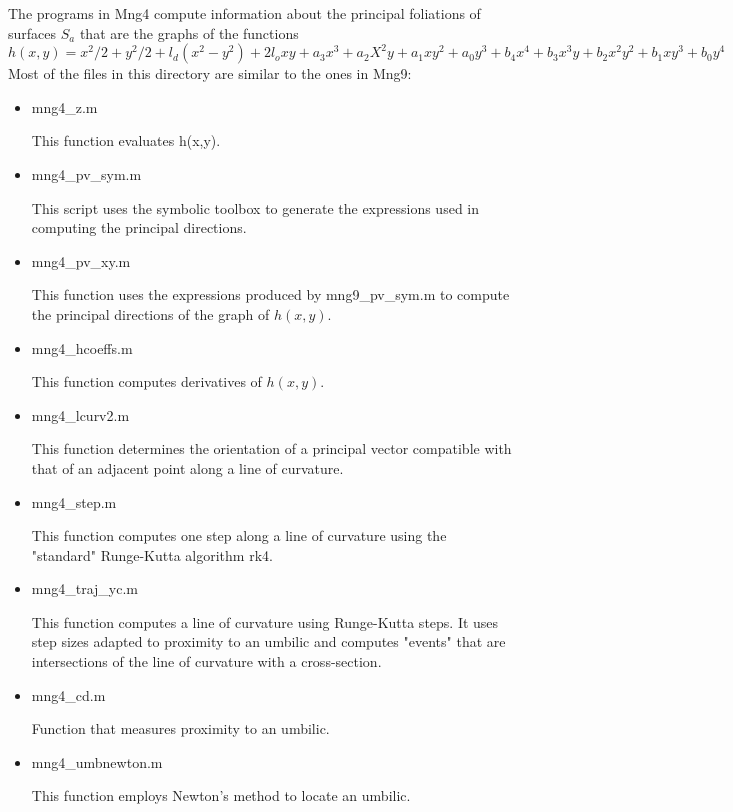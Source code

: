 \documentclass{article}[12pt]
\begin{document}
The programs in Mng4 compute information about the principal foliations of surfaces $S_a$ that are the graphs of the functions 
$$h(x,y) = x^2/2 +y^2/2 + l_d(x^2-y^2) + 2l_o xy + a_3 x^3 + a_2 X^2y +a_1 x y^2 +a_0 y^3 + b_4 x^4 +b_3 x^3 y + b_2 x^2 y^2 + b_1 x y^3 + b_0 y^4$$
Most of the files in this directory are similar to the ones in Mng9:

\begin{itemize}
\item
mng4\_z.m

This function evaluates h(x,y).

\item
mng4\_pv\_sym.m

This script uses the symbolic toolbox to generate the expressions used in computing the principal directions.

\item
mng4\_pv\_xy.m 

This function uses the expressions produced  by mng9\_pv\_sym.m to compute the principal directions of the graph of $h(x,y)$.

\item
mng4\_hcoeffs.m

This function computes derivatives of $h(x,y)$.

\item
mng4\_lcurv2.m

This function determines the orientation of a principal vector compatible with that of an adjacent point along a line of curvature. 

\item
mng4\_step.m

This function computes one step along a line of curvature using the "standard" Runge-Kutta algorithm rk4.

\item
mng4\_traj\_yc.m

This function computes a line of curvature using Runge-Kutta steps. It uses step sizes adapted to proximity to an umbilic and computes "events" that are intersections of the line of curvature with a cross-section.

\item
mng4\_cd.m

Function that measures proximity to an umbilic.

\item
mng4\_umbnewton.m

This function employs Newton's method to locate an umbilic.


\end{itemize}
\end{document}

